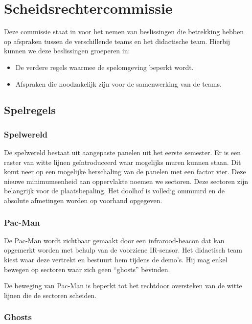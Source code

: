 \documentclass[12pt,a4paper]{report}
\begin{document}
\chapter{Scheidsrechtercommissie}

Deze commissie staat in voor het nemen van beslissingen die betrekking hebben op afspraken tussen de verschillende teams en het didactische team. Hierbij kunnen we deze beslissingen groeperen in:

\begin{itemize}
	\item De verdere regels waarmee de spelomgeving beperkt wordt.
	\item Afspraken die noodzakelijk zijn voor de samenwerking van de teams.
\end{itemize}

\section{Spelregels}

\subsection{Spelwereld}

De spelwereld bestaat uit aangepaste panelen uit het eerste semester. Er is een raster van witte lijnen ge\"introduceerd waar mogelijks muren kunnen staan. Dit komt neer op een mogelijke herschaling van de panelen met een factor vier. Deze nieuwe minimumeenheid aan oppervlakte noemen we sectoren. Deze sectoren zijn belangrijk voor de plaatsbepaling. Het doolhof is volledig ommuurd en de absolute afmetingen worden op voorhand opgegeven.

\subsection{Pac-Man}

De Pac-Man wordt zichtbaar gemaakt door een infrarood-beacon dat kan opgemerkt worden met behulp van de voorziene IR-sensor. Het didactisch team kiest waar deze vertrekt en bestuurt hem tijdens de demo's. Hij mag enkel bewegen op sectoren waar zich geen ``ghosts'' bevinden.

De beweging van Pac-Man is beperkt tot het rechtdoor oversteken van de witte lijnen die de sectoren scheiden.

\subsection{Ghosts}
\end{document}
